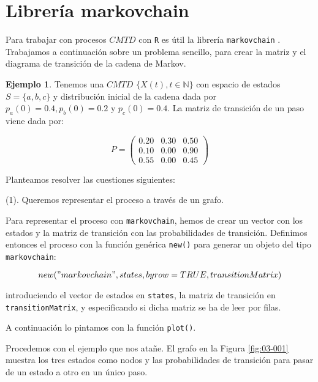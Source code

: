 \documentclass[
]{book}
\newenvironment{whitebox}{
  \definecolor{shadecolor}{rgb}{255, 255, 255}  
  \color{black}
  \begin{shaded}}
 {\end{shaded}}
\theoremstyle{definition}
\theoremstyle{definition}
\newtheorem{example}{Ejemplo}[chapter]
\theoremstyle{definition}
\theoremstyle{definition}
\theoremstyle{remark}
\begin{document}
\hypertarget{libMC}{%
\section{Librería markovchain}\label{libMC}}

Para trabajar con procesos \(CMTD\) con \texttt{R} es útil la librería \texttt{markovchain} \citep{R-markovchain}. Trabajamos a continuación sobre un problema sencillo, para crear la matriz y el diagrama de transición de la cadena de Markov.

\begin{example}
\protect\hypertarget{exm:diagramCMTD}{}\label{exm:diagramCMTD}Tenemos una \(CMTD\) \(\{X(t), t \in \mathbb{N}\}\) con espacio de estados \(S = \{a, b, c\}\) y distribución inicial de la cadena dada por \(p_a(0)=0.4, p_b(0)=0.2\) y \(p_c(0)=0.4\). La matriz de transición de un paso viene dada por:

\[P = 
\begin{pmatrix}
0.20 & 0.30 & 0.50\\
0.10 & 0.00 & 0.90\\
0.55 & 0.00 & 0.45
\end{pmatrix}\]
\end{example}

Planteamos resolver las cuestiones siguientes:

(1). Queremos representar el proceso a través de un grafo.

\begin{whitebox}
Para representar el proceso con \texttt{markovchain}, hemos de crear un vector con los estados y la matriz de transición con las probabilidades de transición. Definimos entonces el proceso con la función genérica \texttt{new()} para generar un objeto del tipo \texttt{markovchain}:

\[new("markovchain",states,byrow=TRUE,transitionMatrix)\]

introduciendo el vector de estados en \texttt{states}, la matriz de transición en \texttt{transitionMatrix}, y especificando si dicha matriz se ha de leer por filas.

A continuación lo pintamos con la función \texttt{plot()}.

\end{whitebox}

Procedemos con el ejemplo que nos atañe. El grafo en la Figura \ref{fig:03-001} muestra los tres estados como nodos y las probabilidades de transición para pasar de un estado a otro en un único paso.
\end{document}
